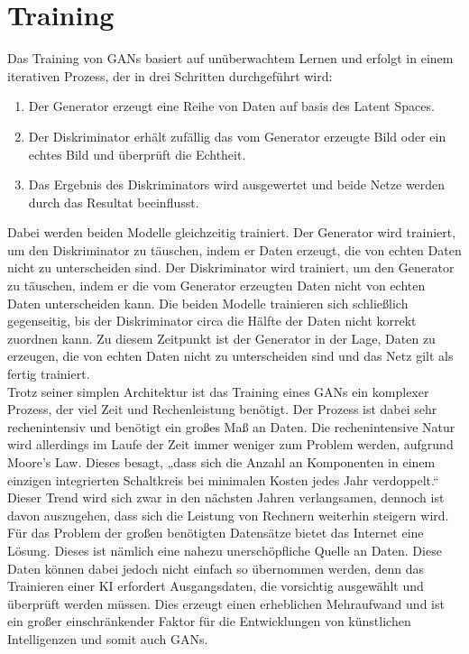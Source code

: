 \section{Training}

\noindent Das Training von \acp{GAN} basiert auf unüberwachtem Lernen und erfolgt in einem iterativen Prozess, der in drei Schritten durchgeführt wird: \\
\begin{enumerate}
    \item Der Generator erzeugt eine Reihe von Daten auf basis des Latent Spaces.
    \item Der Diskriminator erhält zufällig das vom Generator erzeugte Bild oder ein echtes Bild und überprüft die Echtheit.
    \item Das Ergebnis des Diskriminators wird ausgewertet und beide Netze werden durch das Resultat beeinflusst. \\
\end{enumerate}

\noindent Dabei werden beiden Modelle gleichzeitig trainiert. Der Generator wird trainiert, um den Diskriminator zu täuschen, indem er Daten erzeugt, die von echten Daten nicht zu unterscheiden sind. Der Diskriminator wird trainiert, um den Generator zu täuschen, indem er die vom Generator erzeugten Daten nicht von echten Daten unterscheiden kann. Die beiden Modelle trainieren sich schließlich gegenseitig, bis der Diskriminator circa die Hälfte der Daten nicht korrekt zuordnen kann. Zu diesem Zeitpunkt ist der Generator in der Lage, Daten zu erzeugen, die von echten Daten nicht zu unterscheiden sind und das Netz gilt als fertig trainiert. \\

\noindent Trotz seiner simplen Architektur ist das Training eines \acp{GAN} ein komplexer Prozess, der viel Zeit und Rechenleistung benötigt. Der Prozess ist dabei sehr rechenintensiv und benötigt ein großes Maß an Daten. Die rechenintensive Natur wird allerdings im Laufe der Zeit immer weniger zum Problem werden, aufgrund Moore's Law. Dieses besagt, „dass sich die Anzahl an Komponenten in einem einzigen integrierten Schaltkreis bei minimalen Kosten jedes Jahr verdoppelt.“ \cite{moore} Dieser Trend wird sich zwar in den nächsten Jahren verlangsamen, dennoch ist davon auszugehen, dass sich die Leistung von Rechnern weiterhin steigern wird. Für das Problem der großen benötigten Datensätze bietet das Internet eine Lösung. Dieses ist nämlich eine nahezu unerschöpfliche Quelle an Daten. Diese Daten können dabei jedoch nicht einfach so übernommen werden, denn das Trainieren einer KI erfordert Ausgangsdaten, die vorsichtig ausgewählt und überprüft werden müssen. Dies erzeugt einen erheblichen Mehraufwand und ist ein großer einschränkender Faktor für die Entwicklungen von künstlichen Intelligenzen und somit auch \acp{GAN}.\\

\newpage